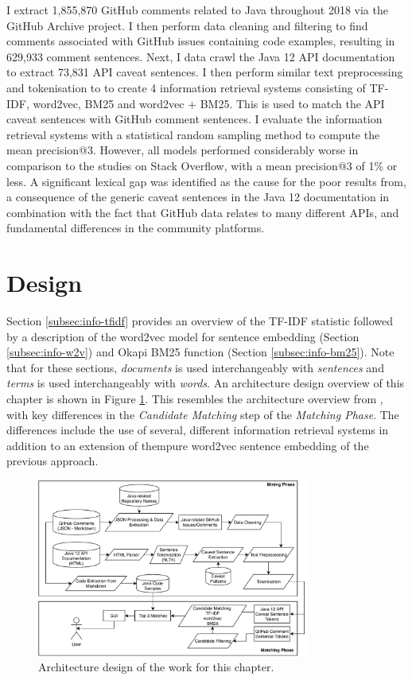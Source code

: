 I extract 1,855,870 GitHub comments related to Java throughout 2018 via the GitHub Archive project. I then perform data cleaning and filtering to find comments associated with GitHub issues containing code examples, resulting in 629,933 comment sentences. Next, I data crawl the Java 12 API documentation to extract 73,831 API caveat sentences. I then perform similar text preprocessing and tokenisation to \cite{jiamou} to create 4 information retrieval systems consisting of TF-IDF, word2vec, BM25 and word2vec + BM25. This is used to match the API caveat sentences with GitHub comment sentences. I evaluate the information retrieval systems with a statistical random sampling method to compute the mean precision@3. However, all models performed considerably worse in comparison to the studies on Stack Overflow, with a mean precision@3 of 1\% or less. A significant lexical gap was identified as the cause for the poor results from, a consequence of the generic caveat sentences in the Java 12 documentation in combination with the fact that GitHub data relates to many different APIs, and fundamental differences in the community platforms.

\section{Design}
\label{sec:info-design}
Section \ref{subsec:info-tfidf} provides an overview of the TF-IDF statistic followed by a description of the word2vec model for sentence embedding (Section \ref{subsec:info-w2v}) and Okapi BM25 function (Section \ref{subsec:info-bm25}). Note that for these sections, \textit{documents} is used interchangeably with \textit{sentences} and \textit{terms} is used interchangeably with \textit{words}. An architecture design overview of this chapter is shown in Figure \ref{fig:github-architecture}. This resembles the architecture overview from \cite{jiamou}, with key differences in the \textit{Candidate Matching} step of the \textit{Matching Phase}. The differences include the use of several, different information retrieval systems in addition to an extension of thempure word2vec sentence embedding of the previous approach.

\begin{figure}
	\label{fig:github-architecture}
	\centering
	\includegraphics[width=0.8\textwidth]{figs/github-architecture.pdf}
	\caption{Architecture design of the work for this chapter.}
\end{figure}

